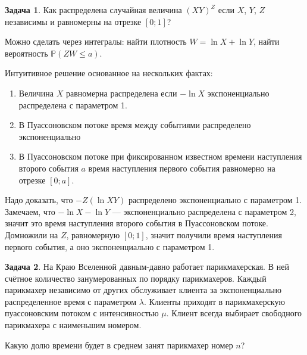 \documentclass[nobib]{tufte-handout}
\theoremstyle{definition}
\newtheorem{problem}{Задача}
\renewcommand{\P}{\mathbb{P}}
\begin{document}
\begin{problem}
Как распределена случайная величина $(XY)^Z$ если $X$, $Y$, $Z$ независимы и равномерны на отрезке $[0;1]$?

\begin{sol}
Можно сделать через интегралы: найти плотность $W = \ln X + \ln Y$, найти вероятность $\P(Z W \leq a)$.

Интуитивное решение основанное на нескольких фактах:

\begin{enumerate}
\item Величина $X$ равномерна распределена если $-\ln X$ экспоненциально распределена с параметром 1.
\item В Пуассоновском потоке время между событиями распределено экспоненциально
\item В Пуассоновском потоке при фиксированном известном времени наступления второго события $a$ время наступления первого события равномерно на отрезке $[0;a]$.
\end{enumerate}

Надо доказать, что $-Z (\ln XY)$ распределено экспоненциально с параметром 1. Замечаем, что $-\ln X - \ln Y$ — экспоненциально распределена с параметром 2, значит это время наступления второго события в Пуассоновском потоке. Домножили на $Z$, равномерную $[0;1]$, значит получили время наступления первого события, а оно экспоненциально с параметром 1.

\end{sol}

\end{problem}


\begin{problem}
На Краю Вселенной давным-давно работает парикмахерская. В ней счётное
количество занумерованных по порядку парикмахеров. Каждый парикмахер
независимо от других обслуживает клиента за экспоненциально
распределенное время с параметром $\lambda$. Клиенты приходят в
парикмахерскую пуассоновским потоком с интенсивностью $\mu$. Клиент
всегда выбирает свободного парикмахера с наименьшим номером.

Какую долю времени будет в среднем занят парикмахер номер $n$?
\begin{sol}
\end{sol}

\end{problem}
\end{document}
